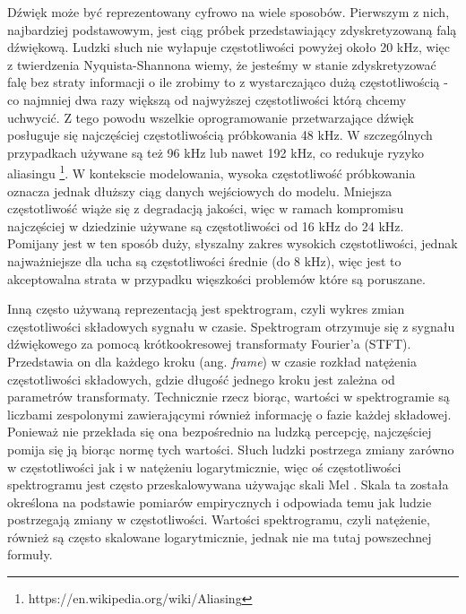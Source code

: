 \documentclass[magisterska]{pracamgr}
\renewcommand{\cite}{\citep}
\begin{document}
Dźwięk może być reprezentowany cyfrowo na wiele sposobów. Pierwszym z nich, najbardziej podstawowym, jest ciąg próbek przedstawiający zdyskretyzowaną falą dźwiękową. Ludzki słuch nie wyłapuje częstotliwości powyżej około 20 kHz, więc z twierdzenia Nyquista-Shannona \cite{shannon49} wiemy, że jesteśmy w stanie zdyskretyzować falę bez straty informacji o ile zrobimy to z wystarczająco dużą częstotliwością - co najmniej dwa razy większą od najwyższej częstotliwości którą chcemy uchwycić. Z tego powodu wszelkie oprogramowanie przetwarzające dźwięk posługuje się najczęściej częstotliwością próbkowania 48 kHz. W szczególnych przypadkach używane są też 96 kHz lub nawet 192 kHz, co redukuje ryzyko aliasingu \footnote{https://en.wikipedia.org/wiki/Aliasing}. W kontekscie modelowania, wysoka częstotliwość próbkowania oznacza jednak dłuższy ciąg danych wejściowych do modelu. Mniejsza częstotliwość wiąże się z degradacją jakości, więc w ramach kompromisu najczęściej w dziedzinie używane są częstotliwości od 16 kHz do 24 kHz. Pomijany jest w ten sposób duży, słyszalny zakres wysokich częstotliwości, jednak najważniejsze dla ucha są częstotliwości średnie (do 8 kHz), więc jest to akceptowalna strata w przypadku więszkości problemów które są poruszane.

Inną często używaną reprezentacją jest spektrogram, czyli wykres zmian częstotliwości składowych sygnału w czasie. Spektrogram otrzymuje się z sygnału dźwiękowego za pomocą krótkookresowej transformaty Fourier'a (STFT). Przedstawia on dla każdego kroku (ang. \textit{frame}) w czasie rozkład natężenia częstotliwości składowych, gdzie długość jednego kroku jest zależna od parametrów transformaty. Technicznie rzecz biorąc, wartości w spektrogramie są liczbami zespolonymi zawierającymi również informację o fazie każdej składowej. Ponieważ nie przekłada się ona bezpośrednio na ludzką percepcję, najczęściej pomija się ją biorąc normę tych wartości. Słuch ludzki postrzega zmiany zarówno w częstotliwości jak i w natężeniu logarytmicznie, więc oś częstotliwości spektrogramu jest często przeskalowywana używając skali Mel \cite{melscale}. Skala ta została określona na podstawie pomiarów empirycznych i odpowiada temu jak ludzie postrzegają zmiany w częstotliwości. Wartości spektrogramu, czyli natężenie, również są często skalowane logarytmicznie, jednak nie ma tutaj powszechnej formuły.
\end{document}
